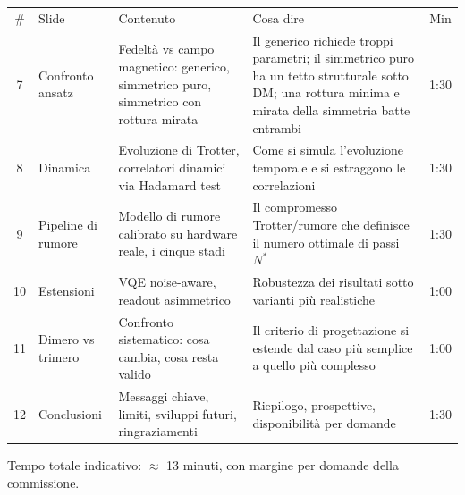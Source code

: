 \documentclass[11pt,a4paper]{article}
\begin{document}
\begin{center}
\begin{tabular}{c L{2.6cm} L{4.7cm} L{5.5cm} c}
\toprule
{}
\\
\midrule
\# & Slide & Contenuto & Cosa dire & Min \\
\midrule
{}
7 & Confronto ansatz & Fedeltà vs campo magnetico: generico, simmetrico puro, simmetrico con rottura mirata & Il generico richiede troppi parametri; il simmetrico puro ha un tetto strutturale sotto DM; una rottura minima e mirata della simmetria batte entrambi & 1:30 \\
8 & Dinamica & Evoluzione di Trotter, correlatori dinamici via Hadamard test & Come si simula l'evoluzione temporale e si estraggono le correlazioni & 1:30 \\
9 & Pipeline di rumore & Modello di rumore calibrato su hardware reale, i cinque stadi & Il compromesso Trotter/rumore che definisce il numero ottimale di passi $N^*$ & 1:30 \\
10 & Estensioni & VQE noise-aware, readout asimmetrico & Robustezza dei risultati sotto varianti più realistiche & 1:00 \\
11 & Dimero vs trimero & Confronto sistematico: cosa cambia, cosa resta valido & Il criterio di progettazione si estende dal caso più semplice a quello più complesso & 1:00 \\
12 & Conclusioni & Messaggi chiave, limiti, sviluppi futuri, ringraziamenti & Riepilogo, prospettive, disponibilità per domande & 1:30 \\
\bottomrule
\end{tabular}
\end{center}

\vspace{10pt}
\noindent\footnotesize Tempo totale indicativo: $\approx$ 13 minuti, con margine per domande della commissione.
\end{document}
